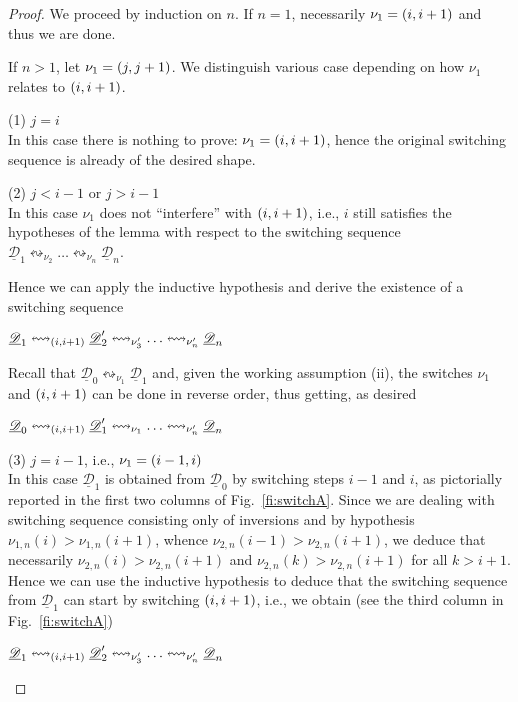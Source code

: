 \documentclass[a4paper,UKenglish,cleveref,pdftex,thm-restate,numberwithinsect,anonymous]{lipics}
\newcommand{\dder}[1]{\mathscr{#1}}
\newcommand{\der}[1]{\underline{\dder{#1}}}
\newcommand{\shift}[1]{\ensuremath{\mathrel{{\leftrightsquigarrow}_{#1}}}}
\begin{document}
\begin{proof}
  We proceed by induction on $n$. If $n=1$, necessarily
  $\nu_1 =  \transp{i}$ and thus we are done.

  If $n>1$, let $\nu_1 = \transp{j}$.  We distinguish various case
  depending on how $\nu_1$ relates to $\transp{i}$.

  \bigskip
  \noindent
  (1) $j=i$\\
  In this case there is nothing to prove: $\nu_1 = \transp{i}$, hence
  the original switching sequence is already of the desired shape.

  \bigskip
  \noindent
  (2) $j<i-1$ or $j>i-1$\\
  In this case $\nu_1$ does not ``interfere'' with $\transp{i}$, i.e.,
  $i$ still satisfies the hypotheses of the lemma with respect to the
  switching sequence
  $\der{D}_1 \shift{\nu_2} \ldots \shift{\nu_n} \der{D}_n$.

  Hence we can apply the inductive hypothesis and derive the existence
  of a switching sequence
  \begin{center}
    $\der{D}_1 \shift{\transp{i}} \der{D}_2' \shift{\nu_3'} \ldots \shift{\nu_n'} \der{D}_n$
  \end{center}

  Recall that $\der{D}_0 \shift{\nu_1} \der{D}_1$ and, given the
  working assumption (ii), the switches $\nu_1$ and $\transp{i}$ can
  be done in reverse order, thus getting, as desired
  \begin{center}
    $\der{D}_0 \shift{\transp{i}} \der{D}_1' \shift{\nu_1} \ldots
    \shift{\nu_n'} \der{D}_n$
  \end{center}


  \bigskip
  \noindent
  (3) $j=i-1$, i.e., $\nu_1 = \transp{i-1}[i]$\\
  In this case $\der{D}_1$ is obtained from $\der{D}_0$ by switching
  steps $i-1$ and $i$, as pictorially reported in the first two
  columns of Fig.~\ref{fi:switchA}. Since we are dealing with
  switching sequence consisting only of inversions and by hypothesis
  $\nu_{1,n}(i) > \nu_{1,n}(i+1)$, whence
  $\nu_{2,n}(i-1) > \nu_{2,n}(i+1)$, we deduce that necessarily
  $\nu_{2,n}(i) > \nu_{2,n}(i+1)$ and $\nu_{2,n}(k) > \nu_{2,n}(i+1)$
  for all $k > i+1$. Hence we can use the inductive hypothesis to
  deduce that the switching sequence from $\der{D}_1$ can start by
  switching $\transp{i}$, i.e., we obtain (see the third column in
  Fig.~\ref{fi:switchA})
  \begin{center}
    $\der{D}_1 \shift{\transp{i}} \der{D}_2' \shift{\nu_3'} \ldots
    \shift{\nu_n'} \der{D}_n$
  \end{center}


\end{proof}
\end{document}
